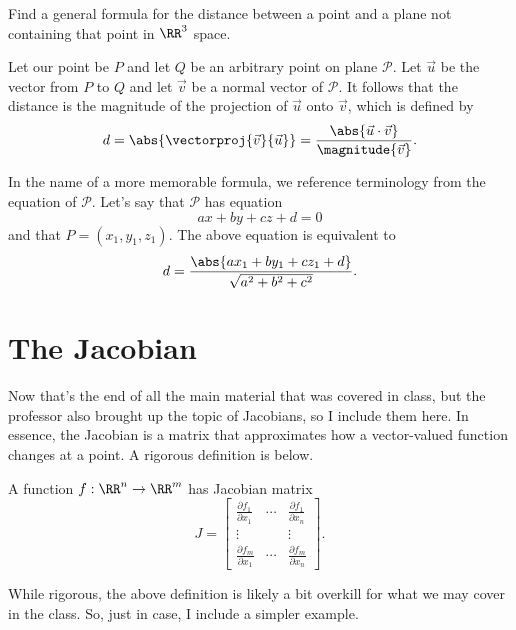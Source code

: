 \begin{example}
    Find a general formula for the distance between a point and a plane not containing that point in $\RR^{3}$ space.

    \begin{soln}
        Let our point be $P$ and let $Q$ be an arbitrary point on plane $\mathcal{P}$. Let $\vec{u}$ be the vector from $P$ to $Q$ and let $\vec{v}$ be a normal vector of $\mathcal{P}$. It follows that the distance is the magnitude of the projection of $\vec{u}$ onto $\vec{v}$, which is defined by
        \[d = \abs{\vectorproj{\vec{v}}{\vec{u}}} = \frac{\abs{\vec{u} \cdot \vec{v}}}{\magnitude{\vec{v}}}.\]

        In the name of a more memorable formula, we reference terminology from the equation of $\mathcal{P}$. Let's say that $\mathcal{P}$ has equation
        \[ax + by + cz + d = 0\]
        and that $P = (x_{1}, y_{1}, z_{1})$. The above equation is equivalent to
        \[d = \frac{\abs{ax_{1} + by_{1} + cz_{1} + d}}{\sqrt{a^{2} + b^{2} + c^{2}}}.\]
    \end{soln}
\end{example}

\section{The Jacobian}

Now that's the end of all the main material that was covered in class, but the professor also brought up the topic of Jacobians, so I include them here. In essence, the Jacobian is a matrix that approximates how a vector-valued function changes at a point. A rigorous definition is below.

\begin{definition}
    A function $f : \RR^{n} \to \RR^{m}$ has Jacobian matrix
    \[J = \begin{bmatrix}
        \frac{\partial f_{1}}{\partial x_{1}} & \cdots & \frac{\partial f_{1}}{\partial x_{n}} \\
        \vdots & & \vdots \\
        \frac{\partial f_{m}}{\partial x_{1}} & \cdots & \frac{\partial f_{m}}{\partial x_{n}}
    \end{bmatrix}.\]
\end{definition}

While rigorous, the above definition is likely a bit overkill for what we may cover in the class. So, just in case, I include a simpler example.

